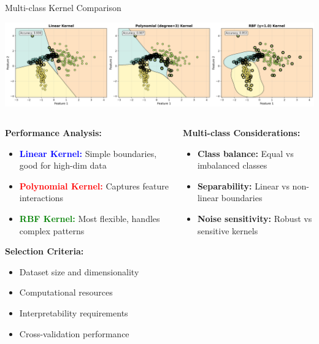 \documentclass[8pt,aspectratio=1610]{beamer}
\begin{document}
\begin{frame}{Multi-class Kernel Comparison}
\begin{center}
\includegraphics[width=\textwidth]{../figures/kernel_multiclass_comparison.png}
\end{center}

\begin{columns}[t]
\begin{column}{0.48\textwidth}
\textbf{Performance Analysis:}
\vspace{0.2cm}

\begin{itemize}
\setlength{\itemsep}{1pt}
\item \textcolor{blue}{\textbf{Linear Kernel:}} Simple boundaries, good for high-dim data
\item \textcolor{red}{\textbf{Polynomial Kernel:}} Captures feature interactions
\item \textcolor{green}{\textbf{RBF Kernel:}} Most flexible, handles complex patterns
\end{itemize}

\vspace{0.3cm}
\textbf{Selection Criteria:}
\begin{itemize}
\setlength{\itemsep}{1pt}
\item Dataset size and dimensionality
\item Computational resources
\item Interpretability requirements
\item Cross-validation performance
\end{itemize}
\end{column}

\begin{column}{0.48\textwidth}
\textbf{Multi-class Considerations:}
\vspace{0.2cm}

\begin{itemize}
\setlength{\itemsep}{1pt}
\item \textbf{Class balance:} Equal vs imbalanced classes
\item \textbf{Separability:} Linear vs non-linear boundaries
\item \textbf{Noise sensitivity:} Robust vs sensitive kernels
\end{itemize}


\end{column}
\end{columns}
\end{frame}
\end{document}
